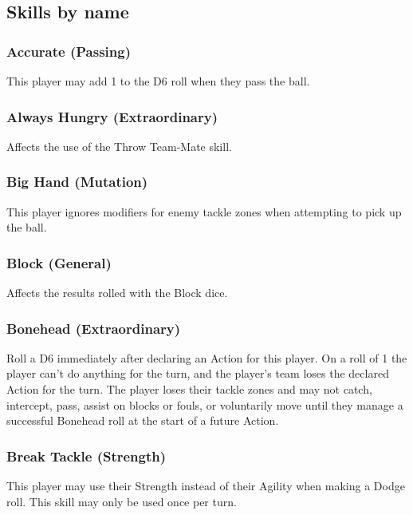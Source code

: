 \documentclass{article}
\begin{document}
\subsection{Skills by name}

\begin{multicols}{3}

\subsubsection{Accurate (Passing)}
\par This player may add 1 to the D6 roll when they pass the ball.

\subsubsection{Always Hungry (Extraordinary)}
\par Affects the use of the Throw Team-Mate skill.

\subsubsection{Big Hand (Mutation)}
\par This player ignores modifiers for enemy tackle zones when attempting to pick up the ball.

\subsubsection{Block (General)}
\par Affects the results rolled with the Block dice.

\subsubsection{Bonehead (Extraordinary)}
\par Roll a D6 immediately after declaring an Action for this player. On a roll of 1 the player can't do anything for the turn, and the player's team loses the declared Action for the turn. The player loses their tackle zones and may not catch, intercept, pass, assist on blocks or fouls, or voluntarily move until they manage a successful Bonehead roll at the start of a future Action.

\subsubsection{Break Tackle (Strength)}
\par This player may use their Strength instead of their Agility when making a Dodge roll. This skill may only be used once per turn.


\end{multicols}
\end{document}
